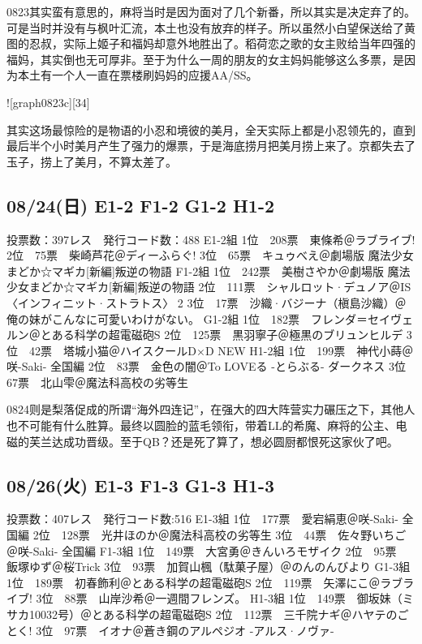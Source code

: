 0823其实蛮有意思的，麻将当时是因为面对了几个新番，所以其实是决定弃了的。可是当时并没有与枫叶汇流，本土也没有放弃的样子。所以虽然小白望保送给了黄图的忍叔，实际上姬子和福妈却意外地胜出了。稻荷恋之歌的女主败给当年四强的福妈，其实倒也无可厚非。至于为什么一周的朋友的女主妈妈能够这么多票，是因为本土有一个人一直在票楼刷妈妈的应援AA/SS。

![graph0823c][34]

其实这场最惊险的是物语的小忍和境彼的美月，全天实际上都是小忍领先的，直到最后半个小时美月产生了强力的爆票，于是海底捞月把美月捞上来了。京都失去了玉子，捞上了美月，不算太差了。

\subsection{08/24(日) E1-2 F1-2 G1-2 H1-2}

    投票数：397レス　発行コード数：488
    E1-2組
    1位　208票　東條希＠ラブライブ!
    2位　75票　柴崎芦花＠ディーふらぐ!
    3位　65票　キュゥべえ＠劇場版 魔法少女まどか☆マギカ[新編]叛逆の物語
    F1-2組
    1位　242票　美樹さやか＠劇場版 魔法少女まどか☆マギカ[新編]叛逆の物語
    2位　111票　シャルロット·デュノア＠IS〈インフィニット·ストラトス〉 2
    3位　17票　沙織·バジーナ（槇島沙織）＠俺の妹がこんなに可愛いわけがない。
    G1-2組
    1位　182票　フレンダ＝セイヴェルン＠とある科学の超電磁砲S
    2位　125票　黒羽寧子＠極黒のブリュンヒルデ
    3位　42票　塔城小猫＠ハイスクールD×D NEW
    H1-2組
    1位　199票　神代小蒔＠咲-Saki- 全国編
    2位　83票　金色の闇＠To LOVEる -とらぶる- ダークネス
    3位　67票　北山雫＠魔法科高校の劣等生

0824则是梨落促成的所谓“海外四连记”，在强大的四大阵营实力碾压之下，其他人也不可能有什么胜算。最终以圆脸的蓝毛领衔，带着LL的希魔、麻将的公主、电磁的芙兰达成功晋级。至于QB？还是死了算了，想必圆厨都恨死这家伙了吧。

\subsection{08/26(火) E1-3 F1-3 G1-3 H1-3}

    投票数：407レス　発行コード数:516
    E1-3組
    1位　177票　愛宕絹恵＠咲-Saki- 全国編
    2位　128票　光井ほのか＠魔法科高校の劣等生
    3位　44票　佐々野いちご＠咲-Saki- 全国編
    F1-3組
    1位　149票　大宮勇＠きんいろモザイク
    2位　95票　飯塚ゆず＠桜Trick
    3位　93票　加賀山楓（駄菓子屋）＠のんのんびより
    G1-3組
    1位　189票　初春飾利＠とある科学の超電磁砲S
    2位　119票　矢澤にこ＠ラブライブ!
    3位　88票　山岸沙希＠一週間フレンズ。
    H1-3組
    1位　149票　御坂妹（ミサカ10032号）＠とある科学の超電磁砲S
    2位　112票　三千院ナギ＠ハヤテのごとく!
    3位　97票　イオナ＠蒼き鋼のアルペジオ -アルス·ノヴァ-

